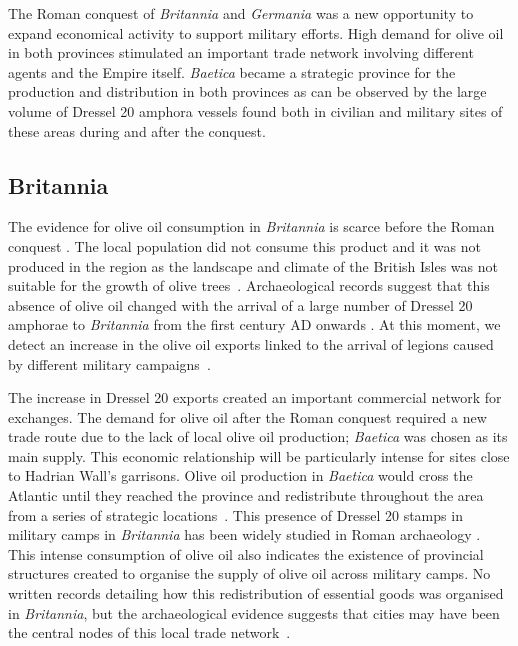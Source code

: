 The Roman conquest of \textit{Britannia} and \textit{Germania} was a new opportunity to expand economical activity to support military efforts. High demand for olive oil in both provinces stimulated an important trade network involving different agents and the Empire itself. \textit{Baetica} became a strategic province for the production and distribution in both provinces as can be observed by the large volume of Dressel 20 amphora vessels found both in civilian and military sites of these areas during and after the conquest. 

\subsection{Britannia}
\label{sec:4}

The evidence for olive oil consumption in \textit{Britannia} is scarce before the Roman conquest \citep{funari_corpus_1996,carreras_abastecimiento_2003}. The local population did not consume this product and it was not produced in the region as the landscape and climate of the British Isles was not suitable for the growth of olive trees~\citep[161]{monfort_britanniaen_1998}. Archaeological records suggest that this absence of olive oil changed with the arrival of a large number of Dressel 20 amphorae to \textit{Britannia} from the first century AD onwards \citep{peacock_amphorae_1991,carreras_britannia_1998}. At this moment, we detect an increase in the olive oil exports linked to the arrival of legions caused by different military campaigns~\citep[161]{monfort_britanniaen_1998}. 

The increase in Dressel 20 exports created an important commercial network for exchanges. The demand for olive oil after the Roman conquest required a new trade route due to the lack of local olive oil production; \textit{Baetica} was chosen as its main supply. This economic relationship will be particularly intense for sites close to Hadrian Wall's garrisons. Olive oil production in \textit{Baetica} would cross the Atlantic until they reached the province and redistribute throughout the area from a series of strategic locations~\citep{carreras_atlantic_2012}. This presence of Dressel 20 stamps in military camps in \textit{Britannia} has been widely studied in Roman archaeology \citep{williams_importation_1983,funari_corpus_1996,carreras_britannia_1998,carreras_abastecimiento_2003}. This intense consumption of olive oil also indicates the existence of provincial structures created to organise the supply of olive oil across military camps. No written records detailing how this redistribution of essential goods was organised in \textit{Britannia}, but the archaeological evidence suggests that cities may have been the central nodes of this local trade network~\citep{funari_economic_2005,orengo_seeds_2016}. 

